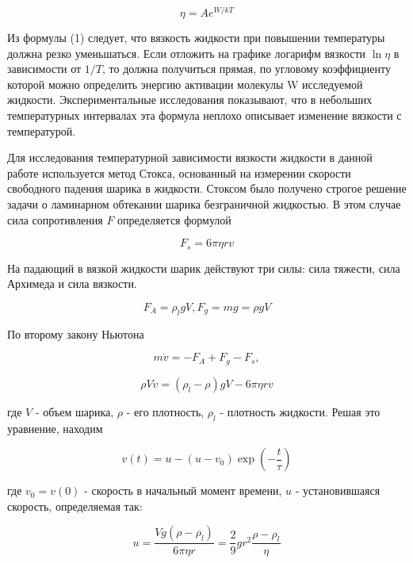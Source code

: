 \documentclass{article}
\begin{document}
	\begin{equation}
		\eta = A e^{W / kT}
	\end{equation}
	
	Из формулы (1) следует, что вязкость жидкости при повышении температуры должна резко уменьшаться. Если отложить на графике логарифм вязкости $\ln \eta$ в зависимости от $1/T$, то должна получиться прямая, по угловому коэффициенту которой можно определить энергию активации молекулы W исследуемой жидкости. Экспериментальные исследования показывают, что в небольших температурных интервалах эта формула неплохо описывает изменение вязкости с температурой.
	
	
	Для исследования температурной зависимости вязкости жидкости в данной работе используется метод Стокса, основанный на измерении скорости свободного падения шарика в жидкости. Стоксом было получено строгое решение задачи о ламинарном обтекании шарика безграничной жидкостью. В этом случае сила сопротивления $F$ определяется формулой
	
	\begin{equation}
		F_s = 6 \pi \eta r v
	\end{equation}
	
	
	На падающий в вязкой жидкости шарик действуют три силы: сила тяжести, сила Архимеда и сила вязкости.
	
	\begin{equation*}
		F_A = \rho_l g V, F_g = mg = \rho g V
	\end{equation*}
	
	По второму закону Ньютона
	
	\begin{equation*}
		m\dot{v} = - F_A + F_g - F_s, 
	\end{equation*}
	
	\begin{equation}
		\rho V \dot{v} = (\rho_l - \rho) g V - 6 \pi \eta r v
	\end{equation}
	
	где $V$ - объем шарика, $\rho$ - его плотность, $\rho_l$ - плотность жидкости. Решая это уравнение, находим
	
	\begin{equation}
		v(t) = u - (u - v_0) \exp(-\frac{t}{\tau})
	\end{equation}
	
	где $v_0 = v(0)$ - скорость в начальный момент времени, $u$ - установившаяся скорость, определяемая так:
	
	\begin{equation*}
		u = \frac{Vg (\rho - \rho_l)}{6 \pi \eta r} = \frac{2}{9} g r^2 \frac{\rho - \rho_l}{\eta}
	\end{equation*}
	
\end{document}
